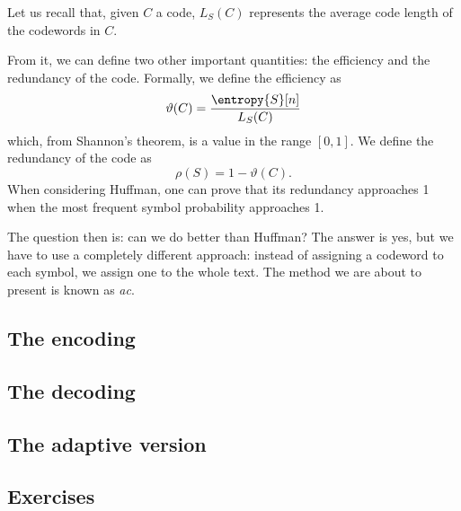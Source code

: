 \documentclass{subfiles}
\begin{document}
    Let us recall that, given \(C\) a code, 
        \(L_{S}(C)\) represents the average code length of the codewords in \(C\).

    From it, we can define two other important quantities: 
        the efficiency and the redundancy of the code.
        Formally, we define the efficiency as 
        \[
            \vartheta(C) = \frac{\entropy{S}[n]}{L_{S}(C)}
        \]
        which, from Shannon's theorem, is a value in the range \([0, 1]\).
        We define the redundancy of the code as 
        \[
            \rho(S) = 1 - \vartheta(C)\text{.}
        \]
        When considering Huffman, 
            one can prove that its redundancy approaches 1 when the most 
            frequent symbol probability approaches 1.

        The question then is: can we do better than Huffman?
            The answer is yes, but we have to use a completely different approach:
            instead of assigning a codeword to each symbol, 
            we assign one to the whole text.
            The method we are about to present is known as \emph{\gls{ac}}.

        \subsection{The encoding}
        

        \subsection{The decoding}
        

        \subsection{The adaptive version}
        

        \subsection{Exercises}
        
\end{document}
